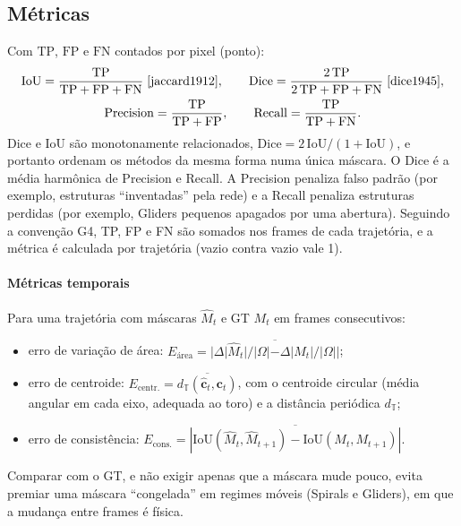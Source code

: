 \subsection{Métricas}
\label{sec:metricas}
Com $\mathrm{TP}$, $\mathrm{FP}$ e $\mathrm{FN}$ contados por pixel (ponto):
\begin{gather}
  \mathrm{IoU} = \frac{\mathrm{TP}}{\mathrm{TP}+\mathrm{FP}+\mathrm{FN}} \;\text{\cite{jaccard1912}},\qquad
  \mathrm{Dice} = \frac{2\,\mathrm{TP}}{2\,\mathrm{TP}+\mathrm{FP}+\mathrm{FN}} \;\text{\cite{dice1945}},\\
  \mathrm{Precision} = \frac{\mathrm{TP}}{\mathrm{TP}+\mathrm{FP}},\qquad
  \mathrm{Recall} = \frac{\mathrm{TP}}{\mathrm{TP}+\mathrm{FN}}.
\end{gather}
Dice e IoU são monotonamente relacionados, $\mathrm{Dice} = 2\,\mathrm{IoU}/(1+\mathrm{IoU})$, e
portanto ordenam os métodos da mesma forma numa única máscara. O Dice é a média harmônica de
Precision e Recall. A Precision penaliza falso padrão (por exemplo, estruturas ``inventadas'' pela
rede) e a Recall penaliza estruturas perdidas (por exemplo, Gliders pequenos apagados por uma
abertura). Seguindo a convenção G4, TP, FP e FN são somados nos frames de cada trajetória, e a
métrica é calculada por trajetória (vazio contra vazio vale 1).

\paragraph{Métricas temporais} Para uma trajetória com máscaras $\hat{M}_t$ e GT $M_t$ em frames
consecutivos:
\begin{itemize}
  \item erro de variação de área:
    $E_{\text{área}} = \overline{|\Delta|\hat{M}_t|/|\Omega| - \Delta|M_t|/|\Omega||}$;
  \item erro de centroide:
    $E_{\text{centr.}} = \overline{d_{\mathbb{T}}(\hat{\mathbf{c}}_t, \mathbf{c}_t)}$, com o
    centroide circular \cite{bai2008} (média angular em cada eixo, adequada ao toro) e a distância
    periódica $d_{\mathbb{T}}$;
  \item erro de consistência:
    $E_{\text{cons.}} = \overline{|\mathrm{IoU}(\hat{M}_t,\hat{M}_{t+1}) - \mathrm{IoU}(M_t,M_{t+1})|}$.
\end{itemize}
Comparar com o GT, e não exigir apenas que a máscara mude pouco, evita premiar uma máscara
``congelada'' em regimes móveis (Spirals e Gliders), em que a mudança entre frames é física.

